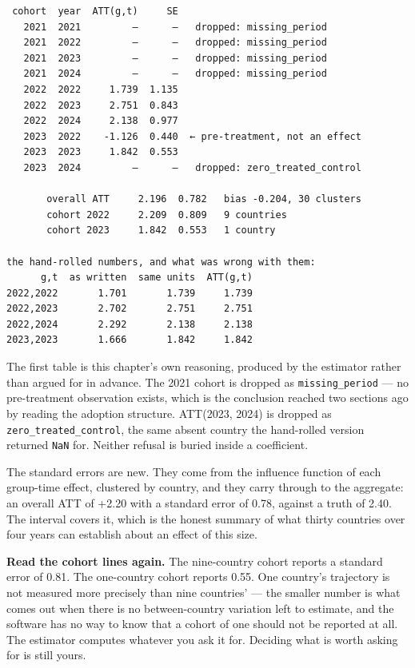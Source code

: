 \documentclass[
  letterpaper,
  10pt,
  twoside,
  openright,
  numbers=noenddot,
  chapterprefix=true]{scrbook}
\begin{document}
\begin{verbatim}
 cohort  year  ATT(g,t)     SE
   2021  2021         —      —   dropped: missing_period
   2021  2022         —      —   dropped: missing_period
   2021  2023         —      —   dropped: missing_period
   2021  2024         —      —   dropped: missing_period
   2022  2022     1.739  1.135
   2022  2023     2.751  0.843
   2022  2024     2.138  0.977
   2023  2022    -1.126  0.440  ← pre-treatment, not an effect
   2023  2023     1.842  0.553
   2023  2024         —      —   dropped: zero_treated_control

       overall ATT     2.196  0.782   bias -0.204, 30 clusters
       cohort 2022     2.209  0.809   9 countries
       cohort 2023     1.842  0.553   1 country

the hand-rolled numbers, and what was wrong with them:
      g,t  as written  same units  ATT(g,t)
2022,2022       1.701       1.739     1.739
2022,2023       2.702       2.751     2.751
2022,2024       2.292       2.138     2.138
2023,2023       1.666       1.842     1.842
\end{verbatim}

The first table is this chapter's own reasoning, produced by the
estimator rather than argued for in advance. The 2021 cohort is dropped
as \texttt{missing\_period} --- no pre-treatment observation exists,
which is the conclusion reached two sections ago by reading the adoption
structure. ATT(2023, 2024) is dropped as
\texttt{zero\_treated\_control}, the same absent country the hand-rolled
version returned \texttt{NaN} for. Neither refusal is buried inside a
coefficient.

The standard errors are new. They come from the influence function of
each group-time effect, clustered by country, and they carry through to
the aggregate: an overall ATT of +2.20 with a standard error of 0.78,
against a truth of 2.40. The interval covers it, which is the honest
summary of what thirty countries over four years can establish about an
effect of this size.

\begin{qmibwarn}

\textbf{Read the cohort lines again.} The nine-country cohort reports a
standard error of 0.81. The one-country cohort reports 0.55. One
country's trajectory is not measured more precisely than nine countries'
--- the smaller number is what comes out when there is no
between-country variation left to estimate, and the software has no way
to know that a cohort of one should not be reported at all. The
estimator computes whatever you ask it for. Deciding what is worth
asking for is still yours.

\end{qmibwarn}
\end{document}
